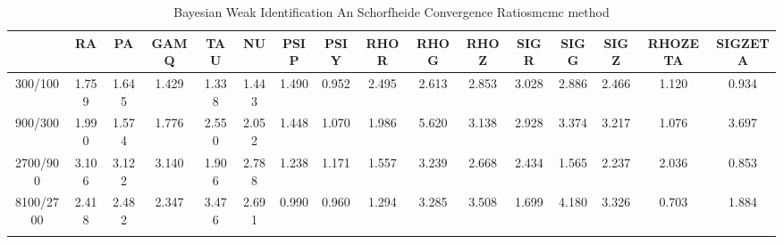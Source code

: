 \documentclass[a4paper,10pt]{article}
\begin{document}
\centering
\begin{longtable}{cccccccccccccccc}
\toprule
 & RA & PA & GAMQ & TAU & NU & PSIP & PSIY & RHOR & RHOG & RHOZ & SIGR & SIGG & SIGZ & RHOZETA & SIGZETA \\
\midrule
300/100 & 1.759 & 1.645 & 1.429 & 1.338 & 1.443 & 1.490 & 0.952 & 2.495 & 2.613 & 2.853 & 3.028 & 2.886 & 2.466 & 1.120 & 0.934 \\
900/300 & 1.990 & 1.574 & 1.776 & 2.550 & 2.052 & 1.448 & 1.070 & 1.986 & 5.620 & 3.138 & 2.928 & 3.374 & 3.217 & 1.076 & 3.697 \\
2700/900 & 3.106 & 3.122 & 3.140 & 1.906 & 2.788 & 1.238 & 1.171 & 1.557 & 3.239 & 2.668 & 2.434 & 1.565 & 2.237 & 2.036 & 0.853 \\
8100/2700 & 2.418 & 2.482 & 2.347 & 3.476 & 2.691 & 0.990 & 0.960 & 1.294 & 3.285 & 3.508 & 1.699 & 4.180 & 3.326 & 0.703 & 1.884 \\
\bottomrule
\caption{Bayesian Weak Identification An Schorfheide Convergence Ratiosmcmc method}
\label{table:tbl:WeakAnSchoConvergenceRatios_mcmc}
\end{longtable}
\end{document}
